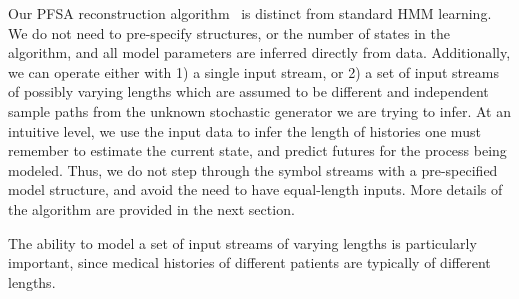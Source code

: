 \documentclass[3p,super,numbers,sort&compress,preprint,10pt]{elsarticle}
\begin{document}
Our PFSA reconstruction algorithm~\cite{CL12g} is distinct from standard HMM learning. We do not need to pre-specify structures, or the number of states in the algorithm, and all model parameters are inferred directly from data. Additionally, we can operate either  with 1) a single input stream, or  2) a set of input streams of possibly varying lengths which are assumed to be different and independent sample paths from the unknown stochastic generator we are trying to infer. At an intuitive level, we use the input data to infer the length of histories one must remember to estimate the current state, and predict futures for the process being modeled. Thus, we do not step     through the symbol streams with a pre-specified model structure, and  avoid the need to have equal-length inputs. More details of the algorithm are provided in the next section.

The ability to model a set of input streams of varying lengths is particularly important, since medical histories of different patients are typically of different lengths.

% 
%  
% 








\clearpage
\end{document}
